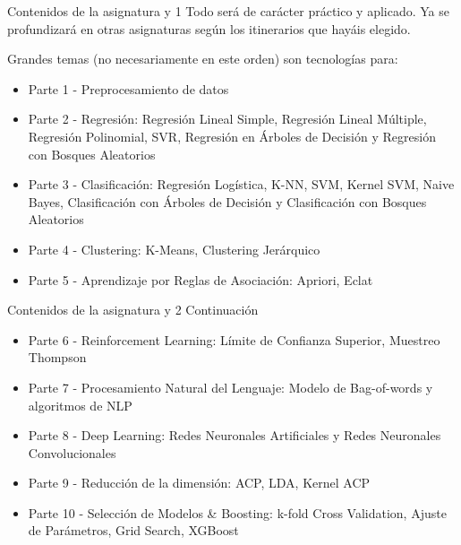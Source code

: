 \documentclass[
  ignorenonframetext,
]{beamer}
\providecommand{\tightlist}{%
  \setlength{\itemsep}{0pt}\setlength{\parskip}{0pt}}
\begin{document}
\begin{frame}{Contenidos de la asignatura y 1}
\protect\hypertarget{contenidos-de-la-asignatura-y-1}{}
Todo será de carácter práctico y aplicado. Ya se profundizará en otras
asignaturas según los itinerarios que hayáis elegido.

Grandes temas (no necesariamente en este orden) son tecnologías para:

\begin{itemize}
\tightlist
\item
  Parte 1 - Preprocesamiento de datos
\item
  Parte 2 - Regresión: Regresión Lineal Simple, Regresión Lineal
  Múltiple, Regresión Polinomial, SVR, Regresión en Árboles de Decisión
  y Regresión con Bosques Aleatorios
\item
  Parte 3 - Clasificación: Regresión Logística, K-NN, SVM, Kernel SVM,
  Naive Bayes, Clasificación con Árboles de Decisión y Clasificación con
  Bosques Aleatorios
\item
  Parte 4 - Clustering: K-Means, Clustering Jerárquico
\item
  Parte 5 - Aprendizaje por Reglas de Asociación: Apriori, Eclat
\end{itemize}
\end{frame}

\begin{frame}{Contenidos de la asignatura y 2}
\protect\hypertarget{contenidos-de-la-asignatura-y-2}{}
Continuación

\begin{itemize}
\tightlist
\item
  Parte 6 - Reinforcement Learning: Límite de Confianza Superior,
  Muestreo Thompson
\item
  Parte 7 - Procesamiento Natural del Lenguaje: Modelo de Bag-of-words y
  algoritmos de NLP
\item
  Parte 8 - Deep Learning: Redes Neuronales Artificiales y Redes
  Neuronales Convolucionales
\item
  Parte 9 - Reducción de la dimensión: ACP, LDA, Kernel ACP
\item
  Parte 10 - Selección de Modelos \& Boosting: k-fold Cross Validation,
  Ajuste de Parámetros, Grid Search, XGBoost
\end{itemize}
\end{frame}
\end{document}
